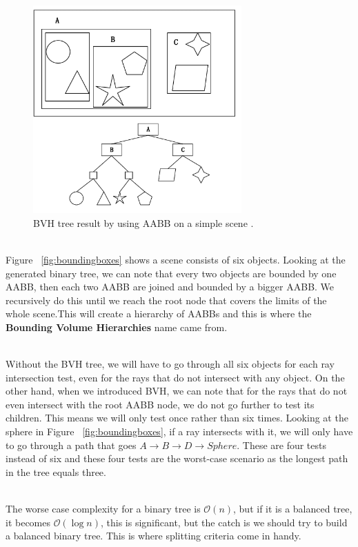 \documentclass[11pt,a4paper]{article}
\begin{document}
\begin{figure}[h]	
     \centering
     \captionsetup{justification=centering,margin=2cm}
     \includegraphics[width=8cm]{images/bvh_tree.png}
     \caption{BVH tree result by using AABB on a simple scene
. \protect\cite{Ericson2004} }
        \label{fig:boundingvolume}
\end{figure}

\noindent
\\
Figure ~\ref{fig:boundingboxes} shows a scene consists of six objects. Looking at the generated binary tree, we can note that every two objects are bounded by one AABB, then each two AABB are joined and bounded by a bigger AABB. We recursively do this until we reach the root node that covers the limits of the whole scene.This will create a hierarchy of AABBs and this is where the \textbf{Bounding Volume Hierarchies} name came from.

\noindent
\\
Without the BVH tree, we will have to go through all six objects for each ray intersection test, even for the rays that do not intersect with any object. On the other hand, when we introduced BVH, we can note that for the rays that do not even intersect with the root AABB node, we do not go further to test its children. This means we will only test once rather than six times. Looking at the sphere in Figure ~\ref{fig:boundingboxes}, if a ray intersects with it, we will only have to go through a path that goes $A \rightarrow B \rightarrow D \rightarrow Sphere$. These are four tests instead of six and these four tests are the worst-case scenario as the longest path in the tree equals three. 

\noindent
\\
The worse case complexity for a binary tree is $\mathcal{O}(n)$, but if it is a balanced tree, it becomes $\mathcal{O}(\log{}n)$, this is significant, but the catch is we should try to build a balanced binary tree. This is where splitting criteria come in handy. 
\end{document}
